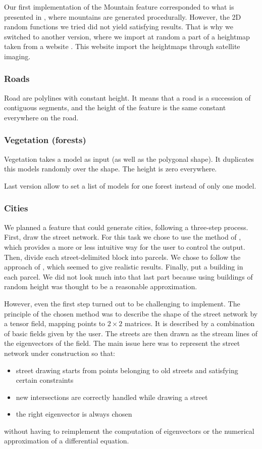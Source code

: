 Our first implementation of the Mountain feature corresponded to what
is presented in \cite{FeatureTree}, where mountains are generated
procedurally. However, the 2D random functions we tried did not yield
satisfying results. That is why we switched to another version, where
we import at random a part of a heightmap taken from a website
\cite{terrain-party}. This website import the heightmaps through
satellite imaging.

\subsubsection{Roads}
Road are polylines with constant height. It means that a road is a succession of contiguous segments, and the height of the feature is the same constant everywhere on the road. 


\subsubsection{Vegetation (forests)}
Vegetation takes a model as input (as well as the polygonal shape). It duplicates this models randomly over the shape. The height is zero everywhere.

Last version allow to set a list of models for one forest instead of only one model.


\subsubsection{Cities}

We planned a feature that could generate cities, following a
three-step process. First, draw the street network. For this task we
chose to use the method of \cite{StreetTensors}, which provides a more
or less intuitive way for the user to control the output. Then, divide
each street-delimited block into parcels. We chose to follow the
approach of \cite{PGParcels}, which seemed to give realistic
results. Finally, put a building in each parcel. We did not look much
into that last part because using buildings of random height was
thought to be a reasonable approximation.

However, even the first step turned out to be challenging to
implement. The principle of the chosen method was to describe the
shape of the street network by a tensor field, mapping points to $2
\times 2$ matrices. It is described by a combination of basic fields
given by the user. The streets are then drawn as the stream lines of
the eigenvectors of the field. The main issue here was to represent
the street network under construction so that:
\begin{itemize}
  \item street drawing starts from points belonging to old streets and
satisfying certain constraints
  \item new intersections are correctly handled while drawing a street
  \item the right eigenvector is always chosen
\end{itemize} without having to reimplement the computation of
eigenvectors or the numerical approximation of a differential
equation.

